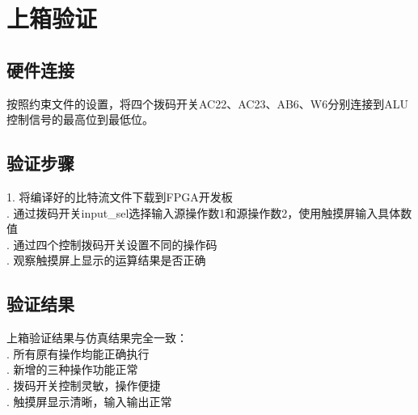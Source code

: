 \documentclass[12pt,a4paper]{article}
\begin{document}



\section{上箱验证}
\subsection{硬件连接}
按照约束文件的设置，将四个拨码开关AC22、AC23、AB6、W6分别连接到ALU控制信号的最高位到最低位。

\subsection{验证步骤}
1. 将编译好的比特流文件下载到FPGA开发板\\
. 通过拨码开关input\_sel选择输入源操作数1和源操作数2，使用触摸屏输入具体数值\\
. 通过四个控制拨码开关设置不同的操作码\\
. 观察触摸屏上显示的运算结果是否正确

\subsection{验证结果}
上箱验证结果与仿真结果完全一致：\\
. 所有原有操作均能正确执行\\
. 新增的三种操作功能正常\\
. 拨码开关控制灵敏，操作便捷\\
. 触摸屏显示清晰，输入输出正常
\end{document}

